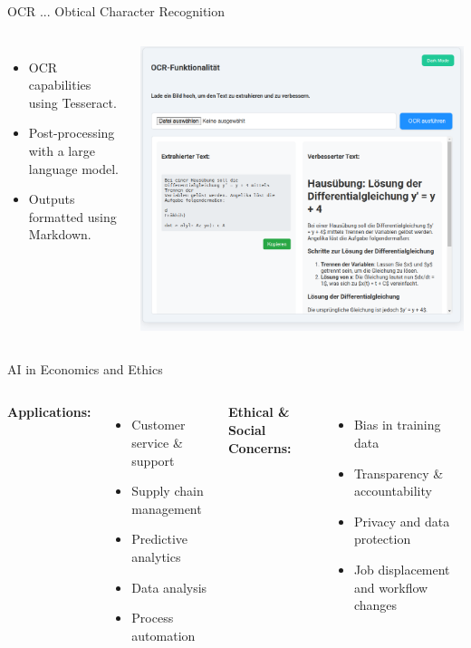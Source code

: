 \documentclass{beamer}
\begin{document}
\begin{frame}{OCR ... Obtical Character Recognition}
  \begin{columns}
      \begin{itemize}
        \item OCR capabilities using Tesseract.
        \item Post-processing with a large language model.
        \item Outputs formatted using Markdown.
      \end{itemize}
      \centering
      \includegraphics[width=\textwidth]{OCR-functonalatie.png}
  \end{columns}
\end{frame}

\begin{frame}{AI in Economics and Ethics}
  \begin{columns}
      \textbf{Applications:}
      \begin{itemize}
        \item Customer service \& support
        \item Supply chain management
        \item Predictive analytics
        \item Data analysis
        \item Process automation
      \end{itemize}
      \textbf{Ethical \& Social Concerns:}
      \begin{itemize}
        \item Bias in training data
        \item Transparency \& accountability
        \item Privacy and data protection
        \item Job displacement and workflow changes
      \end{itemize}
  \end{columns}
\end{frame}
\end{document}
